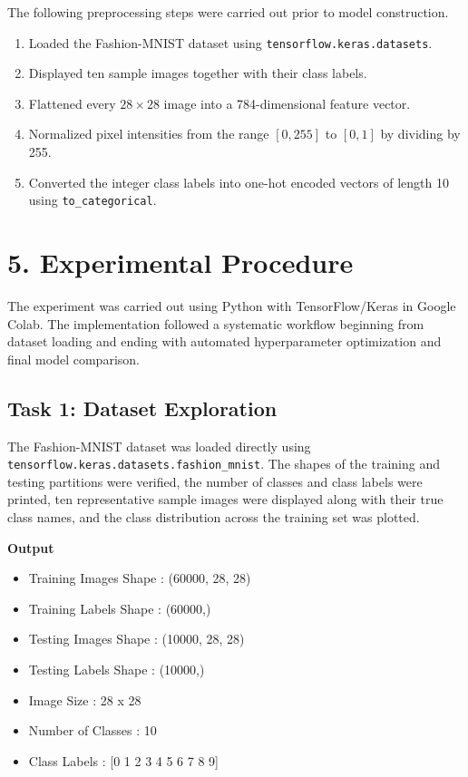 \documentclass[11pt,a4paper]{article}
\begin{document}
The following preprocessing steps were carried out prior to model construction.

\begin{enumerate}
\item Loaded the Fashion-MNIST dataset using \texttt{tensorflow.keras.datasets}.
\item Displayed ten sample images together with their class labels.
\item Flattened every $28\times28$ image into a 784-dimensional feature vector.
\item Normalized pixel intensities from the range $[0,255]$ to $[0,1]$ by dividing by 255.
\item Converted the integer class labels into one-hot encoded vectors of length 10 using \texttt{to\_categorical}.
\end{enumerate}
\section*{5. Experimental Procedure}

The experiment was carried out using Python with TensorFlow/Keras in Google Colab. The implementation followed a systematic workflow beginning from dataset loading and ending with automated hyperparameter optimization and final model comparison.


\subsection*{Task 1: Dataset Exploration}

The Fashion-MNIST dataset was loaded directly using \texttt{tensorflow.keras.datasets.fashion\_mnist}. The shapes of the training and testing partitions were verified, the number of classes and class labels were printed, ten representative sample images were displayed along with their true class names, and the class distribution across the training set was plotted.

\textbf{Output}

\begin{itemize}
\item Training Images Shape : (60000, 28, 28)
\item Training Labels Shape : (60000,)
\item Testing Images Shape : (10000, 28, 28)
\item Testing Labels Shape : (10000,)
\item Image Size : 28 x 28
\item Number of Classes : 10
\item Class Labels : [0 1 2 3 4 5 6 7 8 9]
\end{itemize}
\end{document}
